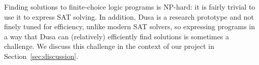 Finding solutions to finite-choice logic programs is NP-hard: it is fairly
trivial to use it to express SAT solving. In addition, Dusa is a research
prototype and not finely tuned for efficiency, unlike modern SAT solvers,
so expressing programs in a way that Dusa can (relatively) efficiently find
solutions is sometimes a challenge.  We discuss this challenge in the context
of our project in Section~\ref{sec:discussion}.



